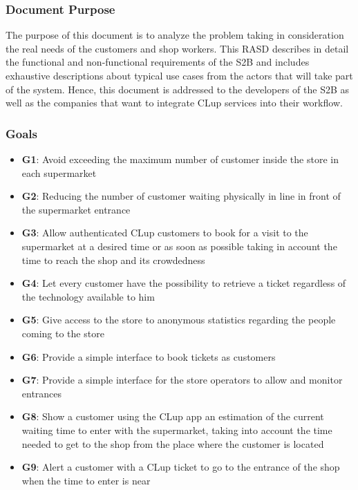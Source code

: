 \subsubsection{Document Purpose}

The purpose of this document is to analyze the problem taking in consideration the real needs of the customers and shop workers.
This RASD describes in detail the functional and non-functional requirements of the S2B and includes exhaustive descriptions about typical use cases from the actors that will take part of the system.
Hence, this document is addressed to the developers of the S2B as well as the companies that want to integrate CLup services into their workflow.

\vfill

\pagebreak

\subsubsection{Goals}
\begin{itemize}

      \item \textbf{G1}: Avoid exceeding the maximum number of customer inside the store in each supermarket

      \item \textbf{G2}: Reducing the number of customer waiting physically in line in front of the supermarket entrance

      \item \textbf{G3}: Allow authenticated CLup customers to book for a visit to the supermarket at a desired time or as soon as possible taking in account the time to reach the shop and its crowdedness

      \item \textbf{G4}: Let every customer have the possibility to retrieve a ticket regardless of the technology available to him

      \item \textbf{G5}: Give access to the store to anonymous statistics regarding the people coming to the store

      \item \textbf{G6}: Provide a simple interface to book tickets as customers

      \item \textbf{G7}: Provide a simple interface for the store operators to allow and monitor entrances

      \item \textbf{G8}: Show a customer using the CLup app an estimation of the current waiting time to enter with the supermarket, taking into account the time needed to get to the shop from the place where the customer is located

      \item \textbf{G9}: Alert a customer with a CLup ticket to go to the entrance of the shop when the time to enter is near
\end{itemize}

